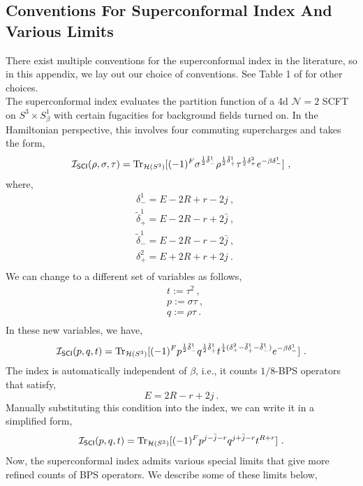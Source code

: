 \documentclass[a4paper,10pt]{article}
\newcommand{\mr}[1]{\mathsf{#1}}
\newcommand{\tsf}[1]{\textsf{#1}}
\def\CI {{\cal I}}
\def\CI {{{\cal I}}}
\begin{document}
\begin{appendix}
\section{Conventions For Superconformal Index And Various Limits}\label{app:conventions}
There exist multiple conventions for the superconformal index in the literature, so in this appendix, we lay out our choice of conventions. See Table 1 of \cite{Gadde:2011uv} for other choices. \\
The superconformal index evaluates the partition function of a 4d $\mathcal{N}=2$ \tsf{SCFT} on $S^3\times S^1_{\beta}$ with certain fugacities for background fields turned on. In the Hamiltonian perspective, this involves four commuting supercharges and takes the form,
\begin{equation}
    \CI_{\mr{SCI}}(\rho,\sigma,\tau)=\text{Tr}_{\mathcal{H}(S^3)}[(-1)^F\sigma^{\frac{1}{2}\tilde{\delta}^1_{\dot{-}}}\rho^{\frac{1}{2}\tilde{\delta}^1_{\dot{+}}}\tau^{\frac{1}{2}\delta^2_{+}}e^{-\beta\delta^1_{-}}]~,
\end{equation}
where,
\begin{equation}
    \begin{split}
        &\delta^1_{-}=E-2R+r-2j~, \\
        &\tilde{\delta}^1_{\dot{+}}=E-2R-r+2\bar{j} ~,\\
        &\tilde{\delta}^1_{\dot{-}}=E-2R-r-2\bar{j}~, \\
        &\delta^2_{+}=E+2R+r+2j~. \\
    \end{split}
\end{equation}
We can change to a different set of variables as follows,
\begin{equation}
    \begin{split}
        &t:=\tau^2~, \\
        &p:=\sigma\tau~, \\
        &q:=\rho\tau~. \\
    \end{split}
\end{equation}
In these new variables, we have,
\begin{equation}
    \CI_{\mr{SCI}}(p,q,t)=\text{Tr}_{\mathcal{H}(S^3)}[(-1)^{F}p^{\frac{1}{2}\tilde{\delta}^1_{\dot{-}}}q^{\frac{1}{2}\tilde{\delta}^1_{\dot{+}}}t^{\frac{1}{4}(\delta^2_+-\tilde{\delta}^1_{\dot{+}}-\tilde{\delta}^1_{\dot{-}})}e^{-\beta\delta^1_-}]~.
\end{equation}
The index is automatically independent of $\beta$, i.e., it counts $1/8$-BPS operators that satisfy,
\begin{equation}
    E=2R-r+2j~.
\end{equation}
Manually substituting this condition into the index, we can write it in a simplified form,
\begin{equation}
    \CI_{\mr{SCI}}(p,q,t)=\text{Tr}_{\mathcal{H}(S^3)}[(-1)^Fp^{j-\bar{j}-r}q^{j+\bar{j}-r}t^{R+r}]~.
\end{equation}
Now, the superconformal index admits various special limits that give more refined counts of BPS operators. We describe some of these limits below, 

\end{appendix}
\end{document}
